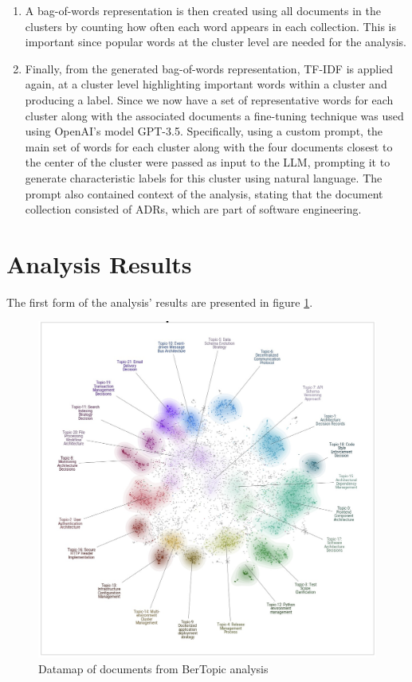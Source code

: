 \begin{enumerate}
            \item A bag-of-words representation is then created using all documents in the clusters by counting how often each word appears in each collection. This is important since popular words at the cluster level are needed for the analysis. 

            \item Finally, from the generated bag-of-words representation, TF-IDF is applied again, at a cluster level highlighting important words within a cluster and producing a label. Since we now have a set of representative words for each cluster along with the associated documents a fine-tuning technique was used using OpenAI's model GPT-3.5. Specifically, using a custom prompt, the main set of words for each cluster along with the four documents closest to the center of the cluster were passed as input to the LLM, prompting it to generate characteristic labels for this cluster using natural language. The prompt also contained context of the analysis, stating that the document collection consisted of ADRs, which are part of software engineering.
            
        \end{enumerate}
        
        
    \section{Analysis Results}
        The first form of the analysis' results are presented in figure \ref{fig:bertopic_datamap_original}.

        \begin{figure}[h]
            \centering
            \includegraphics[scale=0.5]{figures/No Titles/datamap_original_no_title.jpeg}
            \caption{Datamap of documents from BerTopic analysis}
            \label{fig:bertopic_datamap_original}
        \end{figure}
        
